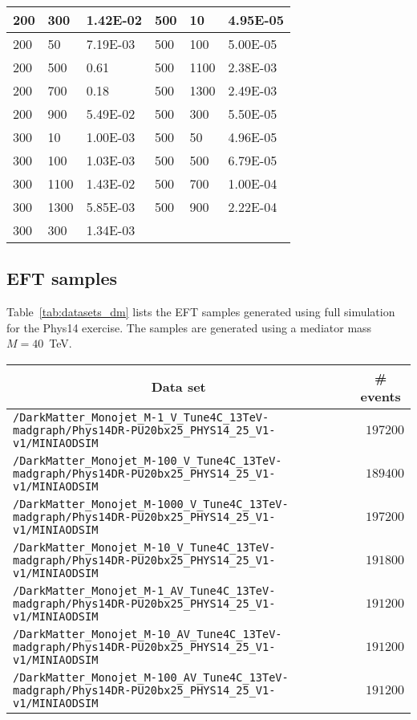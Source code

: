 \begin{table}[h]
\begin{tabular}{lll||lll}
200 & 300  & 1.42E-02 & 500 & 10   & 4.95E-05 \\ \hline
200 & 50   & 7.19E-03 & 500 & 100  & 5.00E-05 \\ \hline
200 & 500  & 0.61     & 500 & 1100 & 2.38E-03 \\ \hline
200 & 700  & 0.18     & 500 & 1300 & 2.49E-03 \\ \hline
200 & 900  & 5.49E-02 & 500 & 300  & 5.50E-05 \\ \hline
300 & 10   & 1.00E-03 & 500 & 50   & 4.96E-05 \\ \hline
300 & 100  & 1.03E-03 & 500 & 500  & 6.79E-05 \\ \hline
300 & 1100 & 1.43E-02 & 500 & 700  & 1.00E-04 \\ \hline
300 & 1300 & 5.85E-03 & 500 & 900  & 2.22E-04 \\ \hline
300 & 300  & 1.34E-03 &     &      &          \\ \hline \hline
\end{tabular}
\end{table}

\subsection{EFT samples}
Table~\ref{tab:datasets_dm} lists the EFT samples generated using full simulation for the Phys14 exercise. The samples are generated using a mediator mass $M=40$~TeV.
\begin{sidewaystable}[h]
    \centering
    \caption{EFT dark matter samples for axial-vector and axial couplings using a mediator mass $M=40$~TeV \label{tab:datasets_dm}}
    \begin{tabular}{lr}
      \hline\hline
      \multicolumn{1}{c}{Data set}&\multicolumn{1}{c}{\# events}\tabularnewline
      \hline
      {\footnotesize \verb!/DarkMatter_Monojet_M-1_V_Tune4C_13TeV-madgraph/Phys14DR-PU20bx25_PHYS14_25_V1-v1/MINIAODSIM!   } &$197200$\tabularnewline
      {\footnotesize \verb!/DarkMatter_Monojet_M-100_V_Tune4C_13TeV-madgraph/Phys14DR-PU20bx25_PHYS14_25_V1-v1/MINIAODSIM! } &$189400$\tabularnewline
      {\footnotesize \verb!/DarkMatter_Monojet_M-1000_V_Tune4C_13TeV-madgraph/Phys14DR-PU20bx25_PHYS14_25_V1-v1/MINIAODSIM!} &$197200$\tabularnewline
      {\footnotesize \verb!/DarkMatter_Monojet_M-10_V_Tune4C_13TeV-madgraph/Phys14DR-PU20bx25_PHYS14_25_V1-v1/MINIAODSIM!  } &$191800$\tabularnewline
      {\footnotesize \verb!/DarkMatter_Monojet_M-1_AV_Tune4C_13TeV-madgraph/Phys14DR-PU20bx25_PHYS14_25_V1-v1/MINIAODSIM!  } &$191200$\tabularnewline
      {\footnotesize \verb!/DarkMatter_Monojet_M-10_AV_Tune4C_13TeV-madgraph/Phys14DR-PU20bx25_PHYS14_25_V1-v1/MINIAODSIM! } &$191200$\tabularnewline
      {\footnotesize \verb!/DarkMatter_Monojet_M-100_AV_Tune4C_13TeV-madgraph/Phys14DR-PU20bx25_PHYS14_25_V1-v1/MINIAODSIM!} &$191200$\tabularnewline
\hline
\end{tabular}
\end{sidewaystable}


